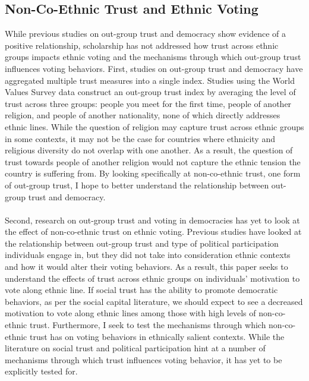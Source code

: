 \documentclass[a4paper, 12pt]{article}
\begin{document}
\subsection{Non-Co-Ethnic Trust and Ethnic Voting}
While previous studies on out-group trust and democracy show evidence of a positive relationship, scholarship has not addressed how trust across ethnic groups impacts ethnic voting and the mechanisms through which out-group trust influences voting behaviors. First, studies on out-group trust and democracy have aggregated multiple trust measures into a single index. Studies using the World Values Survey data construct an out-group trust index by averaging the level of trust across three groups: people you meet for the first time, people of another religion, and people of another nationality, none of which directly addresses ethnic lines. While the question of religion may capture trust across ethnic groups in some contexts, it may not be the case for countries where ethnicity and religious diversity do not overlap with one another. As a result, the question of trust towards people of another religion would not capture the ethnic tension the country is suffering from. By looking specifically at non-co-ethnic trust, one form of out-group trust, I hope to better understand the relationship between out-group trust and democracy.
\paragraph{}
Second, research on out-group trust and voting in democracies has yet to look at the effect of non-co-ethnic trust on ethnic voting. Previous studies have looked at the relationship between out-group trust and type of political participation individuals engage in, but they did not take into consideration ethnic contexts and how it would alter their voting behaviors. As a result, this paper seeks to understand the effects of trust across ethnic groups on individuals’ motivation to vote along ethnic line. If social trust has the ability to promote democratic behaviors, as per the social capital literature, we should expect to see a decreased motivation to vote along ethnic lines among those with high levels of non-co-ethnic trust. Furthermore, I seek to test the mechanisms through which non-co-ethnic trust has on voting behaviors in ethnically salient contexts. While the literature on social trust and political participation hint at a number of mechanisms through which trust influences voting behavior, it has yet to be explicitly tested for. 
\end{document}
